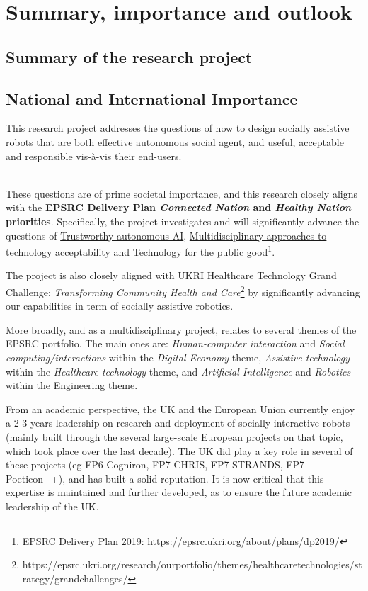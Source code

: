 
\vspace{3em}
\section{Summary, importance and outlook}

\subsection{Summary of the research project}



\subsection{National and International Importance}

This research project addresses the questions of how to design socially
assistive robots that are both effective autonomous social agent, and useful,
acceptable and responsible vis-à-vis their end-users.

{\color{gray} \\
These questions are of prime societal importance, and this research closely
aligns with the \textbf{EPSRC Delivery Plan \emph{Connected Nation} and
\emph{Healthy Nation} priorities}. Specifically, the project
investigates and will significantly advance the questions of \ul{Trustworthy
autonomous AI}, \ul{Multidisciplinary approaches to technology acceptability}
and \ul{Technology for the public good}\footnote{EPSRC Delivery Plan 2019:
\url{https://epsrc.ukri.org/about/plans/dp2019/}}.

The project is also closely aligned with UKRI Healthcare Technology Grand
Challenge: \emph{Transforming Community Health and
Care}\footnote{https://epsrc.ukri.org/research/ourportfolio/themes/healthcaretechnologies/strategy/grandchallenges/}
by significantly advancing our capabilities in term of socially assistive
robotics.

More broadly, and as a multidisciplinary project, \project relates to several
themes of the EPSRC portfolio. The main ones are: \emph{Human-computer
interaction} and \emph{Social computing/interactions} within the \emph{Digital
Economy} theme, \emph{Assistive technology} within the \emph{Healthcare
technology} theme, and \emph{Artificial Intelligence} and \emph{Robotics} within
the Engineering theme.
}

From an academic perspective, the UK and the European Union currently enjoy a
2-3 years leadership on research and deployment of socially interactive robots
(mainly built through the several large-scale European projects on that topic,
which took place over the last decade). The UK did play a key role in several of
these projects (eg FP6-Cogniron, FP7-CHRIS, FP7-STRANDS, FP7-Poeticon++), and
has built a solid reputation. It is now critical that this expertise is
maintained and further developed, as to ensure the future academic leadership of
the UK.

